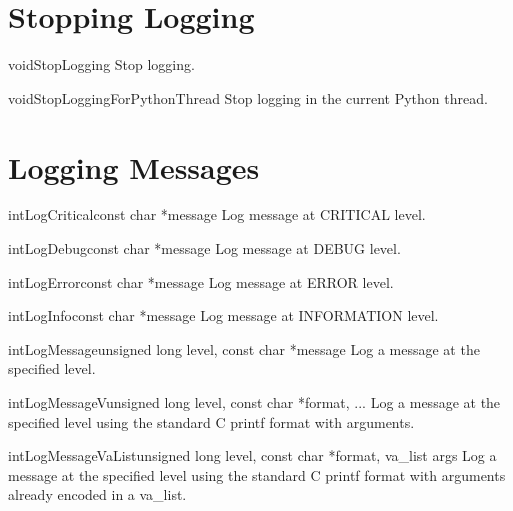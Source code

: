 \documentclass{manual}
\begin{document}
\section{Stopping Logging\label{cStopLogging}}

\begin{cfuncdesc}{void}{StopLogging}{}
  Stop logging.
\end{cfuncdesc}

\begin{cfuncdesc}{void}{StopLoggingForPythonThread}{}
  Stop logging in the current Python thread.
\end{cfuncdesc}


\section{Logging Messages\label{cLoggingMessages}}

\begin{cfuncdesc}{int}{LogCritical}{const char *message}
  Log message at CRITICAL level.
\end{cfuncdesc}

\begin{cfuncdesc}{int}{LogDebug}{const char *message}
  Log message at DEBUG level.
\end{cfuncdesc}

\begin{cfuncdesc}{int}{LogError}{const char *message}
  Log message at ERROR level.
\end{cfuncdesc}

\begin{cfuncdesc}{int}{LogInfo}{const char *message}
  Log message at INFORMATION level.
\end{cfuncdesc}

\begin{cfuncdesc}{int}{LogMessage}{unsigned long level, const char *message}
  Log a message at the specified level.
\end{cfuncdesc}

\begin{cfuncdesc}{int}{LogMessageV}{unsigned long level, const char *format,
        ...}
  Log a message at the specified level using the standard C printf format with
  arguments.
\end{cfuncdesc}

\begin{cfuncdesc}{int}{LogMessageVaList}{unsigned long level,
        const char *format, va_list args}
  Log a message at the specified level using the standard C printf format with
  arguments already encoded in a va_list.
\end{cfuncdesc}
\end{document}
